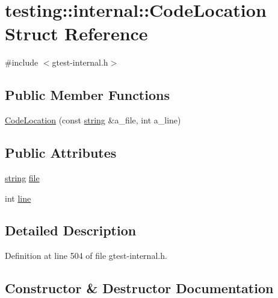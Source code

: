 \hypertarget{structtesting_1_1internal_1_1_code_location}{}\section{testing\+:\+:internal\+:\+:Code\+Location Struct Reference}
\label{structtesting_1_1internal_1_1_code_location}


{\ttfamily \#include $<$gtest-\/internal.\+h$>$}

\subsection*{Public Member Functions}
\begin{DoxyCompactItemize}
\item 
\hyperlink{structtesting_1_1internal_1_1_code_location_ade3ecb2a54905619cd40a6856b48cd5a}{Code\+Location} (const \hyperlink{namespacetesting_1_1internal_a8e8ff5b11e64078831112677156cb111}{string} \&a\+\_\+file, int a\+\_\+line)
\end{DoxyCompactItemize}
\subsection*{Public Attributes}
\begin{DoxyCompactItemize}
\item 
\hyperlink{namespacetesting_1_1internal_a8e8ff5b11e64078831112677156cb111}{string} \hyperlink{structtesting_1_1internal_1_1_code_location_ab8a24d5e63295e411d37578dbb9427c0}{file}
\item 
int \hyperlink{structtesting_1_1internal_1_1_code_location_a01c977c7e8834a05a6d6c40b0c416045}{line}
\end{DoxyCompactItemize}


\subsection{Detailed Description}


Definition at line 504 of file gtest-\/internal.\+h.



\subsection{Constructor \& Destructor Documentation}
